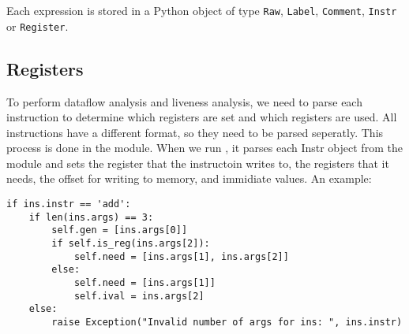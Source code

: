 Each expression is stored in a Python object of type \verb!Raw!, \verb!Label!, \verb!Comment!, \verb!Instr! or \verb!Register!.

\subsection{Registers}
To perform dataflow analysis and liveness analysis, we need to parse each 
instruction to determine which registers are set and which registers are used. 
All instructions have a different format, so they need to be parsed seperatly. 
This process is done in the  module. When we run ,
it parses each Instr object from the  module and sets the register that the
instructoin writes to, the registers that it needs, the offset for writing to 
memory, and immidiate values. An example:
\begin{lstlisting}
if ins.instr == 'add':  
    if len(ins.args) == 3:
        self.gen = [ins.args[0]]
        if self.is_reg(ins.args[2]):
            self.need = [ins.args[1], ins.args[2]]
        else: 
            self.need = [ins.args[1]]
            self.ival = ins.args[2]
    else:
        raise Exception("Invalid number of args for ins: ", ins.instr)   
\end{lstlisting}
